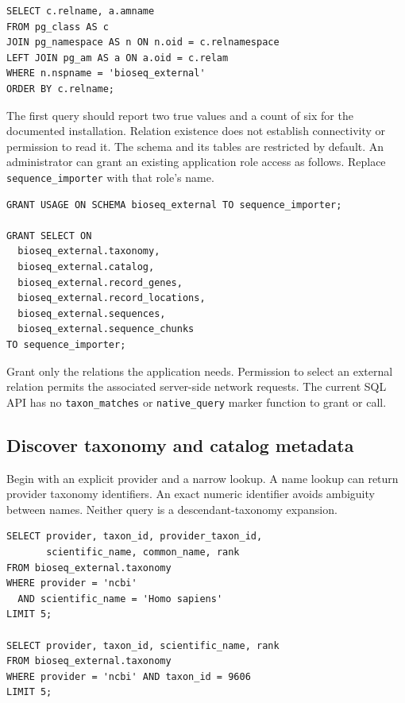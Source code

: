 \par\noindent\begin{minipage}{\linewidth}
\begin{lstlisting}[style=bioseq-appendix-sql]
SELECT c.relname, a.amname
FROM pg_class AS c
JOIN pg_namespace AS n ON n.oid = c.relnamespace
LEFT JOIN pg_am AS a ON a.oid = c.relam
WHERE n.nspname = 'bioseq_external'
ORDER BY c.relname;
\end{lstlisting}
\end{minipage}

The first query should report two true values and a count of six for the
documented installation. Relation existence does not establish connectivity or
permission to read it. The schema and its tables are restricted by default.
An administrator can grant an existing application role access as follows.
Replace \texttt{sequence\_importer} with that role's name.

\par\noindent\begin{minipage}{\linewidth}
\begin{lstlisting}[style=bioseq-appendix-sql]
GRANT USAGE ON SCHEMA bioseq_external TO sequence_importer;

GRANT SELECT ON
  bioseq_external.taxonomy,
  bioseq_external.catalog,
  bioseq_external.record_genes,
  bioseq_external.record_locations,
  bioseq_external.sequences,
  bioseq_external.sequence_chunks
TO sequence_importer;
\end{lstlisting}
\end{minipage}

Grant only the relations the application needs. Permission to select an
external relation permits the associated server-side network requests.
The current SQL API has no \texttt{taxon\_matches} or
\texttt{native\_query} marker function to grant or call.

\subsection{Discover taxonomy and catalog metadata}
\label{app-remote-discovery}

Begin with an explicit provider and a narrow lookup. A name lookup can return
provider taxonomy identifiers. An exact numeric identifier avoids ambiguity
between names. Neither query is a descendant-taxonomy expansion.

\par\noindent\begin{minipage}{\linewidth}
\begin{lstlisting}[style=bioseq-appendix-sql]
SELECT provider, taxon_id, provider_taxon_id,
       scientific_name, common_name, rank
FROM bioseq_external.taxonomy
WHERE provider = 'ncbi'
  AND scientific_name = 'Homo sapiens'
LIMIT 5;

SELECT provider, taxon_id, scientific_name, rank
FROM bioseq_external.taxonomy
WHERE provider = 'ncbi' AND taxon_id = 9606
LIMIT 5;
\end{lstlisting}
\end{minipage}

